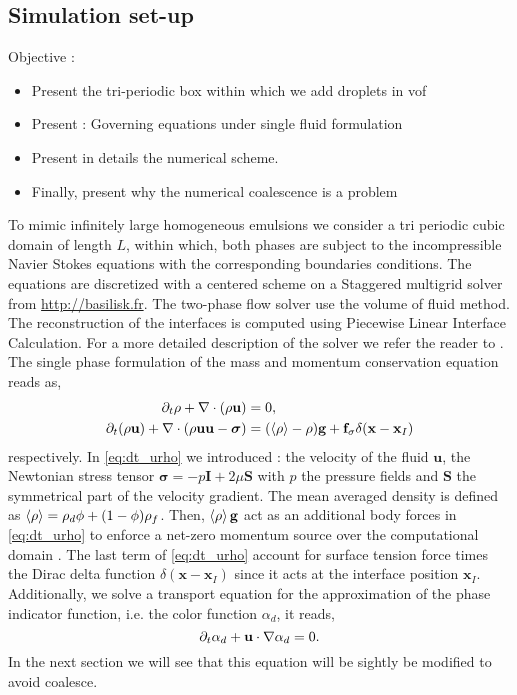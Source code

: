 


\subsection{Simulation set-up}
Objective : 
\begin{itemize}
    \item Present the tri-periodic box within which we add droplets in vof 
    \item Present : Governing equations under single fluid formulation 
    \item Present in details the numerical scheme. 
    \item Finally, present why the numerical coalescence is a problem
\end{itemize}

To mimic infinitely large homogeneous emulsions we consider a tri periodic cubic domain of length $L$, within which, both phases are subject to the incompressible Navier Stokes equations with the corresponding boundaries conditions. 
The equations are discretized with a centered scheme on a Staggered multigrid solver from \url{http://basilisk.fr}. 
The two-phase flow solver use the volume of fluid method. 
The reconstruction of the interfaces is computed using Piecewise Linear Interface Calculation. 
For a more detailed description of the solver we refer the reader to \citet{popinet2018numerical}. 
The single phase formulation of the mass and momentum conservation equation reads as,
\begin{align}
    \label{eq:dt_rho}
    \partial_t \rho
    + \mathbf{\nabla}\cdot(\rho\textbf{u})
    &= 0, \\
    \partial_t (\rho \textbf{u})
    +\mathbf{\nabla} \cdot (\rho  \textbf{u} \textbf{u} - \bm{\sigma})
    &= 
    (\left<\rho\right> - \rho)\textbf{g}
    + \textbf{f}_\sigma\delta(\textbf{x} -\textbf{x}_I)
    \label{eq:dt_urho}
\end{align}
respectively.  
In \ref{eq:dt_urho} we introduced : the velocity of the fluid $\textbf{u}$,  the Newtonian stress  tensor $\bm{\sigma} = -p \textbf{I} + 2\mu \textbf{S}$ with $p$ the pressure fields and $\textbf{S}$ the symmetrical part of the velocity gradient.
The mean averaged density is defined as $\left<\rho\right> = \rho_d\phi + (1-\phi) \rho_f$. 
Then, $\left<\rho\right> \textbf{g}$ act as an additional body forces in \ref{eq:dt_urho}  to enforce a net-zero momentum source over the computational domain \citep{bunner2002dynamics}. 
The last term of \ref{eq:dt_urho} account for surface tension force  times the Dirac delta function $\delta(\textbf{x}-\textbf{x}_I)$ since it acts at the interface position $\textbf{x}_I$. 
Additionally, we solve a transport equation for the approximation of the phase indicator function, i.e. the color function $\alpha_d$, it reads,
\begin{equation}
    \partial_t \alpha_d + \textbf{u} \cdot \mathbf{\nabla} \alpha_d =0.
    \label{eq:dt_alpha}
\end{equation}
In the next section we will see that this equation will be sightly be modified to avoid coalesce.

